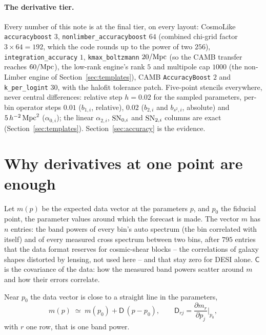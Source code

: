 \documentclass[11pt]{article}
\newcommand{\Cov}{\mathsf{C}}
\newcommand{\aunit}{\,h^{-2}\,{\rm Mpc}^2}
\newcommand{\SNzi}{{\rm SN}_{0,i}}
\newcommand{\SNti}{{\rm SN}_{2,i}}
\newcommand{\mD}{\mathsf{D}}
\newcommand{\us}{\_\allowbreak}
\begin{document}
\paragraph{The derivative tier.}
Every number of this note is at the final tier, on every layout:
CosmoLike \texttt{accuracyboost} $3$,
\texttt{nonlimber\us accuracyboost} $64$ (combined chi-grid factor
$3 \times 64 = 192$, which the code rounds up to the power of two
$256$), \texttt{integration\us accuracy} $1$,
\texttt{kmax\us boltzmann} $20/{\rm Mpc}$ (so the CAMB transfer
reaches $60/{\rm Mpc}$), the low-rank engine's rank $5$ and multipole
cap $1000$ (the non-Limber engine of Section~\ref{sec:templates}),
CAMB \texttt{AccuracyBoost} $2$ and
\texttt{k\us per\us logint} $30$, with the halofit tolerance patch.
Five-point stencils everywhere, never central differences: relative
step $h = 0.02$ for the sampled parameters, per-bin operator steps
$0.01$ ($b_{1,i}$, relative), $0.02$ ($b_{2,i}$ and $b_{s^2,i}$,
absolute) and $5\aunit$ ($\alpha_{0,i}$); the linear $\alpha_{2,i}$,
$\SNzi$ and $\SNti$ columns are exact (Section~\ref{sec:templates}).
Section~\ref{sec:accuracy} is the evidence.

\section{Why derivatives at one point are enough}
\label{sec:linear}

Let $m(p)$ be the expected data vector at the parameters $p$, and $p_0$
the fiducial point, the parameter values around which the forecast is
made.  The vector $m$ has $n$ entries: the band powers of
every bin's auto spectrum (the bin correlated with itself) and of
every measured cross spectrum between
two bins, after $795$ entries that the data format reserves for
cosmic-shear blocks -- the correlations of galaxy shapes distorted by
lensing, not used here -- and that stay zero for DESI alone.  $\Cov$ is the
covariance of the data: how the measured band powers scatter around
$m$ and how their errors correlate.

Near $p_0$ the data vector is close to a straight line in the
parameters,
\begin{equation}
  m(p) \;\simeq\; m(p_0) + \mD\,(p - p_0),
  \qquad
  \mD_{rj} = \frac{\partial m_r}{\partial p_j}\bigg|_{p_0} ,
  \label{eq:linearize}
\end{equation}
with $r$ one row, that is one band power.
\end{document}
